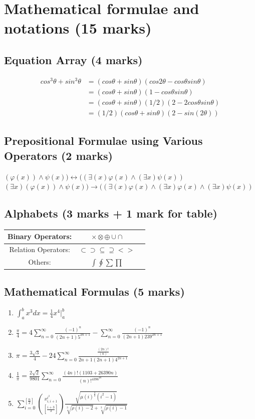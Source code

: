 \documentclass[12pt]{article}
\begin{document}
\section{Mathematical formulae and notations (15 marks)}
\subsection{Equation Array (4 marks)}
\begin{align}
cos^3\theta+sin^3\theta &=(cos\theta+sin\theta)(cos2\theta-cos\theta sin\theta)\label{eq1}\\
						&=(cos\theta+sin\theta)(1-cos\theta sin\theta)\\
						&=(cos\theta+sin\theta)(1/2)(2-2cos\theta sin\theta)\\
						&=(1/2)(cos\theta+sin\theta)(2-sin(2\theta))
\end{align}
\subsection{Prepositional Formulae using Various Operators (2 marks)}
$\displaystyle(\varphi(x))\wedge\psi(x))\longleftrightarrow((\exists(x)\varphi(x)\wedge(\exists x)\psi(x))$\\
$\displaystyle(\exists x)(\varphi(x))\wedge\psi(x))\longrightarrow((\exists(x)\varphi(x)\wedge(\exists x)\varphi(x)\wedge(\exists x)\psi(x))$
\subsection{Alphabets (3 marks + 1 mark for table)}
\begin{center}
\begin{tabular}{ |c|c|c| } 
 \hline
 Binary Operators: & $\times\otimes\oplus\cup\cap$ \\[2ex] 
 \hline
 Relation Operators: & $\subset\supset\subseteq\supseteq<>$ \\[2ex] 
 \hline
 Others: & $\int\oint\sum\prod$ \\[2ex]
 \hline
\end{tabular}
\end{center}
\subsection{Mathematical Formulas (5 marks)}
\boldmath
\begin{enumerate}
	\item $\displaystyle\int_a^b x^3 dx=\frac{1}{4}x^4\bigg\rvert_a^b$
	\item $\displaystyle\frac{\pi}{4}=4\sum\limits_{n=0}^{\infty}\frac{(-1)^n}{(2n+1)5^{2n+1}}-\sum\limits_{n=0}^\infty\frac{(-1)^n}{(2n+1)239^{2n+1}}$
	\item $\displaystyle\pi=\frac{3\sqrt{3}}{4}-24\sum\limits_{n=0}^{\infty}\frac{\frac{(2n)!}{(n)}}{2n+1(2n+1)4^{2n+1}}$
	\item $\displaystyle\frac{1}{\pi}=\frac{2\sqrt{2}}{9801}\sum\limits_{n=0}^{\infty}\frac{(4n)!(1103+26390n)}{(n)!^4396^{4n}}$
	\item $\displaystyle\sum_{i=0}^{\left[\frac{n}{2} \right]} \binom{x^{i^2}_{i,i+1}}{\left[\frac{i+3}{3}\right]} \frac{\sqrt{\mu(i)^{\frac{3}{2}}(i^2-1)}}{\sqrt[3]{\rho(i)-2}+\sqrt[3]{\rho(i)-1}}$
\end{enumerate}
\newpage
\end{document}
